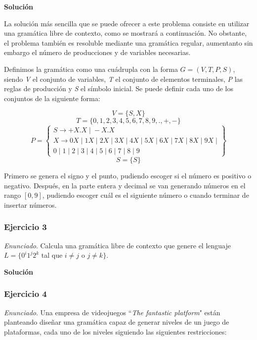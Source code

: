 \documentclass[11pt,a4paper]{article}
\newcommand{\enu}{\textit{Enunciado}}
\newcommand{\sol}{\textbf{Solución}}
\begin{document}
		\sol \par
		La solución más sencilla que se puede ofrecer a este problema consiste en utilizar una gramática
		libre de contexto, como se mostrará a continuación. No obstante, el problema también es resoluble
		mediante una gramática regular, aumentanto sin embargo el número de producciones y de variables
		necesarias. \par
		
		Definimos la gramática como una cuádrupla con la forma $G = (V, T, P, S)$, siendo \textit{V} el conjunto
		de variables, \textit{T} el conjunto de elementos terminales, \textit{P} las reglas de producción y
		\textit{S} el símbolo inicial. Se puede definir cada uno de los conjuntos de la siguiente forma: \par
		
		\[V = \lbrace S, X \rbrace \]
		\[T = \lbrace 0, 1, 2, 3, 4, 5, 6, 7, 8, 9, ., +, -\rbrace \]
		\[P = \left\{\begin{array}{c}
    			S \rightarrow +X.X \; | \; -X.X \\
    			X \rightarrow 0X \; | \; 1X \; | \; 2X \; | \; 3X \; | \; 4X \; | \; 5X \; | \;
    			6X \; | \; 7X \; | \; 8X \; | \; 9X \; | \\ 
    			0 \; | \; 1 \; | \; 2 \; | \; 3 \; | \; 4 \; | \; 5 \; | \; 6 \; | \;
    			7 \; | \; 8 \; | \; 9
  			\end{array}\right\}
		\]
		\[S = \lbrace S \rbrace \]
		
		Primero se genera el signo y el punto, pudiendo escoger si el número es positivo o negativo. Después,
		en la parte entera y decimal se van generando números en el rango $[0, 9]$, pudiendo escoger cuál es
		el siguiente número o cuando terminar de insertar números.
				 
		
		\subsubsection{Ejercicio 3}
		\enu. Calcula una gramática libre de contexto que genere el lenguaje
		$L = \lbrace 0^i 1^j 2^k$
		tal que
		$i \neq j$ o $j \neq k \rbrace$. \par
		
		\sol \par
		
		\subsubsection{Ejercicio 4}
		\enu. Una empresa de videojuegos ``\textit{The fantastic platform}" están planteando diseñar
		una gramática capaz de generar niveles de un juego de plataformas, cada uno de los niveles
		siguiendo las siguientes restricciones:
		
\end{document}
